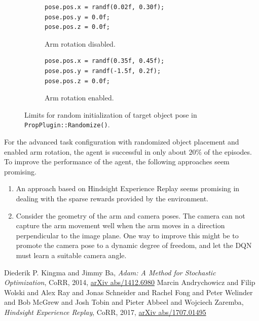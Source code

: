 \documentclass[11pt, onecolumn, oneside, reqno]{amsart}
\begin{document}
\begin{figure}[thpb]
\centering
\begin{subfigure}{.48\textwidth}
\begin{lstlisting}
pose.pos.x = randf(0.02f, 0.30f);
pose.pos.y = 0.0f;
pose.pos.z = 0.0f;
\end{lstlisting}
\caption{Arm rotation disabled.}
\end{subfigure}\hfill%
\begin{subfigure}{.48\textwidth}
\begin{lstlisting}
pose.pos.x = randf(0.35f, 0.45f);
pose.pos.y = randf(-1.5f, 0.2f);
pose.pos.z = 0.0f;
\end{lstlisting}
\caption{Arm rotation enabled.}
\end{subfigure}
\caption{Limits for random initialization of target object pose in \texttt{PropPlugin::Randomize()}.}
\label{fig:random_poses_for_arm_rotation}
\end{figure}

For the advanced task configuration with randomized object placement and enabled arm rotation, the agent is successful in only about $20 \%$ of the episodes. To improve the performance of the agent, the following approaches seem promising.
\begin{enumerate}
\item  An approach based on Hindsight Experience Replay \cite{her_paper} seems promising in dealing with the sparse rewards provided by the environment.
\item Consider the geometry of the arm and camera poses. The camera can not capture the arm movement well when the arm moves in a direction perpendicular to the image plane. One way to improve this might be to promote the camera pose to a dynamic degree of freedom, and let the DQN must learn a suitable camera angle.
\end{enumerate}

\begin{thebibliography}{2}
Diederik P. Kingma and Jimmy Ba, \textit{Adam: {A} Method for Stochastic Optimization}, CoRR, 2014, \href{http://arxiv.org/abs/1412.6980}{arXiv  abs/1412.6980}
Marcin Andrychowicz and Filip Wolski and Alex Ray and Jonas Schneider and Rachel Fong and Peter Welinder and Bob McGrew and Josh Tobin and Pieter Abbeel and Wojciech Zaremba, \textit{Hindsight Experience Replay}, CoRR, 2017, \href{http://arxiv.org/abs/1707.01495}{arXiv abs/1707.01495}
\end{thebibliography}
\end{document}
